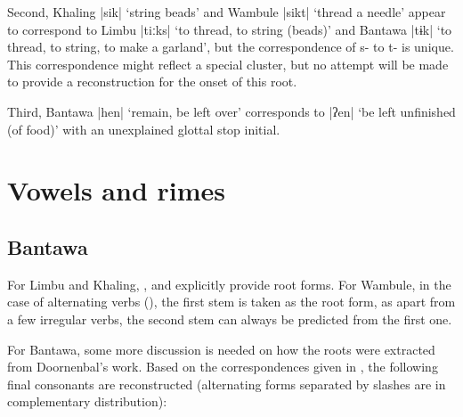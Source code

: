 \documentclass[oneside,a4paper,11pt]{article}
\newcommand{\ipa}[1]{{\phon\mbox{#1}}} %
\newcommand{\dhatu}[2]{|\ipa{#1}| `#2'}
\begin{document}
Second, Khaling \dhatu{sik}{string beads} and Wambule \dhatu{sikt}{thread a needle} appear to correspond to Limbu \dhatu{tiːks}{to thread, to string (beads)}  and Bantawa \dhatu{tɨk}{to thread, to string, to make a garland}, but the correspondence of \ipa{s-} to \ipa{t-} is unique. This correspondence might reflect a special cluster, but no attempt will be made to provide a reconstruction for the onset of this root.

Third, Bantawa \dhatu{hen}{remain, be left over} corresponds to \dhatu{ʔen}{be left unfinished (of food)} with an unexplained glottal stop initial.

\section{Vowels and rimes} \label{sec:rhymes}

\subsection{Bantawa} \label{sec:bantawa}
 
 For Limbu and Khaling, \citet{michailovsky02dico}, \citet{jacques12khaling} and \citet{jacques16si} explicitly provide root forms. For Wambule, in the case of alternating verbs (\citealt[255-263]{opgenort04wambule}), the first stem is taken as the root form, as apart from a few irregular verbs, the second stem can always be predicted from the first one.  
 
 For Bantawa, some more discussion is needed on how the roots were extracted from Doornenbal's work. Based on the correspondences given in \citet[129; 132]{doornenbal09}, the following final consonants are reconstructed (alternating forms separated by slashes are in complementary distribution):
\end{document}
